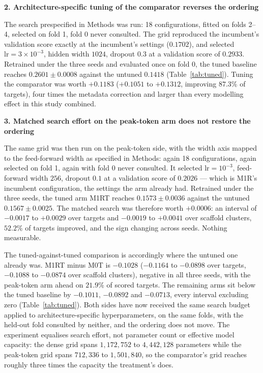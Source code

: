 \documentclass[11pt]{article}
\makeatletter
\newcommand{\hdlab}[2]{\def\@currentlabel{#1}\label{#2}}
\newcommand{\hd}[1]{\medskip\par\noindent\textbf{#1}\par\nobreak\vspace{2pt}\noindent\ignorespaces}
\makeatother
\begin{document}
\hd{2. Architecture-specific tuning of the comparator reverses the ordering}
\hdlab{2}{sec:tuned}
The search prespecified in Methods was run: 18 configurations, fitted on folds 2--4,
selected on fold 1, fold 0 never consulted. The grid reproduced the incumbent's
validation score exactly at the incumbent's settings ($0.1702$), and selected
$\mathrm{lr}=3\times10^{-3}$, hidden width $1024$, dropout $0.3$ at a validation
score of $0.2933$. Retrained under the three seeds and evaluated once on fold 0, the
tuned baseline reaches $0.2601 \pm 0.0008$ against the untuned $0.1418$
(Table~\ref{tab:tuned}). Tuning the comparator was worth $+0.1183$ ($+0.1051$ to
$+0.1312$, improving $87.3\%$ of targets), four times the metadata correction and
larger than every modelling effect in this study combined.

\hd{3. Matched search effort on the peak-token arm does not restore the ordering}
\hdlab{3}{sec:matched}
The same grid was then run on the peak-token side, with the width axis mapped to
the feed-forward width as specified in Methods: again 18 configurations, again
selected on fold 1, again with fold 0 never consulted. It selected
$\mathrm{lr}=10^{-3}$, feed-forward width $256$, dropout $0.1$ at a validation score
of $0.2026$ --- which is M1R's incumbent configuration, the settings the arm already
had. Retrained under the three seeds, the tuned arm M1RT reaches $0.1573 \pm 0.0036$
against the untuned $0.1567 \pm 0.0025$. The matched search was therefore worth
$+0.0006$: an interval of $-0.0017$ to $+0.0029$ over targets and $-0.0019$ to
$+0.0041$ over scaffold clusters, $52.2\%$ of targets improved, and the sign
changing across seeds. Nothing measurable.

The tuned-against-tuned comparison is accordingly where the untuned one already
was. M1RT minus M0T is $-0.1028$ ($-0.1164$ to $-0.0898$ over targets, $-0.1088$ to
$-0.0874$ over scaffold clusters), negative in all three seeds, with the peak-token
arm ahead on $21.9\%$ of scored targets. The remaining arms sit below the tuned
baseline by $-0.1011$, $-0.0892$ and $-0.0713$, every interval excluding zero
(Table~\ref{tab:tuned}). Both sides have now received the same search budget applied to
architecture-specific hyperparameters, on the same folds, with the held-out fold
consulted by neither, and the ordering does not move. The experiment equalises
search effort, not parameter count or effective model capacity: the dense grid spans
$1{,}172{,}752$ to $4{,}442{,}128$ parameters while the peak-token grid spans
$712{,}336$ to $1{,}501{,}840$, so the comparator's grid reaches roughly three times
the capacity the treatment's does.
\end{document}
